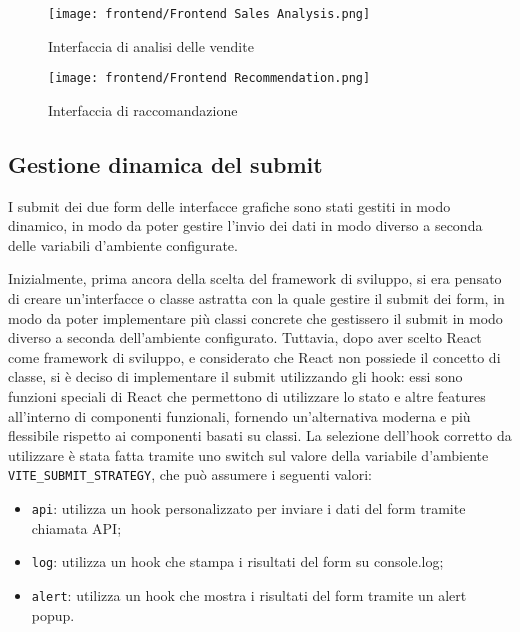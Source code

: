 \begin{figure}[!h]
    \centering
    \texttt{[image: frontend/Frontend Sales Analysis.png]}
    \caption{Interfaccia di analisi delle vendite}
    \label{fig:frontend-sales-analysis}
\end{figure}

\begin{figure}[!h]
    \centering
    \texttt{[image: frontend/Frontend Recommendation.png]}
    \caption{Interfaccia di raccomandazione}
    \label{fig:frontend-recommendation}
\end{figure}


\newpage

\subsection{Gestione dinamica del submit}

I submit dei due form delle interfacce grafiche sono stati gestiti in modo dinamico, in modo da poter gestire l'invio dei dati in modo diverso a seconda delle variabili d'ambiente configurate.

Inizialmente, prima ancora della scelta del framework di sviluppo, si era pensato di creare un'interfacce o classe astratta con la quale gestire il submit dei form, in modo da poter implementare più classi concrete che gestissero il submit in modo diverso a seconda dell'ambiente configurato. Tuttavia, dopo aver scelto React come framework di sviluppo, e considerato che React non possiede il concetto di classe, si è deciso di implementare il submit utilizzando gli hook: essi sono funzioni speciali di React che permettono di utilizzare lo stato e altre features all'interno di componenti funzionali, fornendo un'alternativa moderna e più flessibile rispetto ai componenti basati su classi.
La selezione dell'hook corretto da utilizzare è stata fatta tramite uno switch sul valore della variabile d'ambiente \texttt{VITE\_SUBMIT\_STRATEGY}, che può assumere i seguenti valori:
\begin{itemize}
    \item \texttt{api}: utilizza un hook personalizzato per inviare i dati del form tramite chiamata API;
    \item \texttt{log}: utilizza un hook che stampa i risultati del form su console.log;
    \item \texttt{alert}: utilizza un hook che mostra i risultati del form tramite un alert popup.
\end{itemize}

